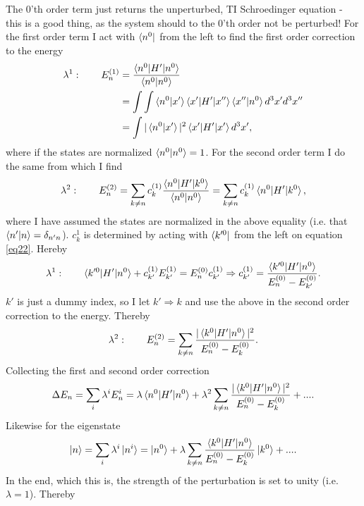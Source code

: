 The $0$'th order term just returns the unperturbed, TI Schroedinger equation - this is a good thing, as the system should to the $0$'th order not be perturbed! For the first order term I act with $\bra{n^0}$ from the left to find the first order correction to the energy
\begin{equation}
	\begin{split}
		\lambda^1:\qquad E_n^{(1)}&=\frac{\braket{n^0|H'|n^0}}{\braket{n^0|n^0}}\\
		&=\int\int\braket{n^0|x'}\braket{x'|H'|x''}\braket{x''|n^0}d^3x'd^3x''\\
		&=\int|\braket{n^0|x'}|^2\braket{x'|H'|x'}d^3x',
	\end{split}
\end{equation} 
where if the states are normalized $\braket{n^0|n^0}=1$. For the second order term I do the same from which I find
\begin{equation}
	\lambda^2:\qquad E_n^{(2)}=\sum_{k\neq n}c_k^{(1)}\frac{\braket{n^0|H'|k^0}}{\braket{n^0|n^0}}=\sum_{k\neq n}c_k^{(1)}\braket{n^0|H'|k^0},
\end{equation} 
where I have assumed the states are normalized in the above equality (i.e. that $\braket{n'|n}=\delta_{n'n}$). $c_k^1$ is determined by acting with $\bra{k'^0}$ from the left on equation \eqref{eq22}. Hereby
\begin{equation}
	\lambda^1:\qquad \braket{k'^0|H'|n^0}+c_{k'}^{(1)}E_{k'}^{(1)}=E_n^{(0)}c_{k'}^{(1)} \Rightarrow c_{k'}^{(1)}=\frac{\braket{k'^0|H'|n^0}}{E_n^{(0)}-E_{k'}^{(0)}}.
\end{equation} 
$k'$ is just a dummy index, so I let $k'\Rightarrow k$ and use the above in the second order correction to the energy. Thereby
\begin{equation}
	\lambda^2:\qquad E_n^{(2)}=\sum_{k\neq n}\frac{|\braket{k^0|H'|n^0}|^2}{E_n^{(0)}-E_k^{(0)}}.
\end{equation} 
Collecting the first and second order correction
\begin{equation}
	\Delta E_n=\sum_{i}\lambda^iE_n^i=\lambda \braket{n^0|H'|n^0}+\lambda^2\sum_{k\neq n}\frac{|\braket{k^0|H'|n^0}|^2}{E_n^{(0)}-E_k^{(0)}}+....
\end{equation} 
Likewise for the eigenstate
\begin{equation}
	\ket{n}=\sum_{i}\lambda^i\ket{n^i}=\ket{n^0}+\lambda\sum_{k\neq n}^{}\frac{\braket{k^0|H'|n^0}}{E_n^{(0)}-E_{k}^{(0)}}\ket{k^0}+....
\end{equation} 
In the end, which this is, the strength of the perturbation is set to unity (i.e. $\lambda=1$). Thereby
